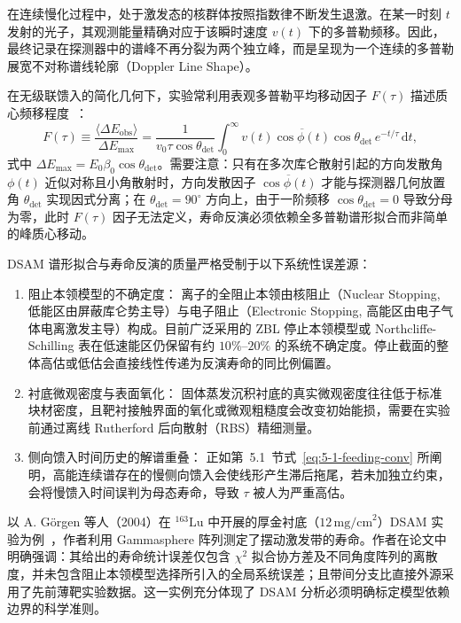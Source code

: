 在连续慢化过程中，处于激发态的核群体按照指数律不断发生退激。在某一时刻 $t$ 发射的光子，其观测能量精确对应于该瞬时速度 $v(t)$ 下的多普勒频移。因此，最终记录在探测器中的谱峰不再分裂为两个独立峰，而是呈现为一个连续的多普勒展宽不对称谱线轮廓（Doppler Line Shape）。

在无级联馈入的简化几何下，实验常利用表观多普勒平均移动因子 $F(\tau)$ 描述质心频移程度~\cite{book-wu-nuclear-experiment-methods}：
\begin{equation}\label{eq:5-8-f-tau}
F(\tau) \equiv \frac{\langle \Delta E_{\mathrm{obs}} \rangle}{\Delta E_{\max}} = \frac{1}{v_0 \tau \cos\theta_{\mathrm{det}}} \int_0^\infty v(t) \overline{\cos\phi(t)} \cos\theta_{\mathrm{det}} \, e^{-t/\tau} \, \mathrm{d}t,
\end{equation}
式中 $\Delta E_{\max} = E_0 \beta_0 \cos\theta_{\mathrm{det}}$。需要注意：只有在多次库仑散射引起的方向发散角 $\phi(t)$ 近似对称且小角散射时，方向发散因子 $\overline{\cos\phi(t)}$ 才能与探测器几何放置角 $\theta_{\mathrm{det}}$ 实现因式分离；在 $\theta_{\mathrm{det}} = 90^\circ$ 方向上，由于一阶频移 $\cos\theta_{\mathrm{det}} = 0$ 导致分母为零，此时 $F(\tau)$ 因子无法定义，寿命反演必须依赖全多普勒谱形拟合而非简单的峰质心移动。

DSAM 谱形拟合与寿命反演的质量严格受制于以下系统性误差源：
\begin{enumerate}
\item 阻止本领模型的不确定度：
离子的全阻止本领由核阻止（Nuclear Stopping, 低能区由屏蔽库仑势主导）与电子阻止（Electronic Stopping, 高能区由电子气体电离激发主导）构成。目前广泛采用的 ZBL 停止本领模型或 Northcliffe-Schilling 表在低速能区仍保留有约 $10\%$–$20\%$ 的系统不确定度。停止截面的整体高估或低估会直接线性传递为反演寿命的同比例偏置。
\item 衬底微观密度与表面氧化：
固体蒸发沉积衬底的真实微观密度往往低于标准块材密度，且靶衬接触界面的氧化或微观粗糙度会改变初始能损，需要在实验前通过离线 Rutherford 后向散射（RBS）精细测量。
\item 侧向馈入时间历史的解谱重叠：
正如第~5.1~节式~\eqref{eq:5-1-feeding-conv} 所阐明，高能连续谱存在的慢侧向馈入会使线形产生滞后拖尾，若未加独立约束，会将慢馈入时间误判为母态寿命，导致 $\tau$ 被人为严重高估。
\end{enumerate}

以 A. Görgen 等人（2004）在 $^{163}\mathrm{Lu}$ 中开展的厚金衬底（$12\,\text{mg/cm}^2$）DSAM 实验为例~\cite{campaign-g07-gorgen-2004-163lu-quadrupole-moments}，作者利用 Gammasphere 阵列测定了摆动激发带的寿命。作者在论文中明确强调：其给出的寿命统计误差仅包含 $\chi^2$ 拟合协方差及不同角度阵列的离散度，并未包含阻止本领模型选择所引入的全局系统误差；且带间分支比直接外源采用了先前薄靶实验数据。这一实例充分体现了 DSAM 分析必须明确标定模型依赖边界的科学准则。

